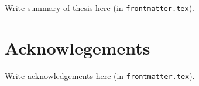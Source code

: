 Write summary of thesis here (in \texttt{frontmatter.tex}).

\newpage

\chapter*{Acknowlegements}

Write acknowledgements here (in \texttt{frontmatter.tex}).

\newpage

\setcounter{page}{5} %

\tableofcontents
\newpage
\listoffigures
\newpage
\listoftables

\newpage
{} %